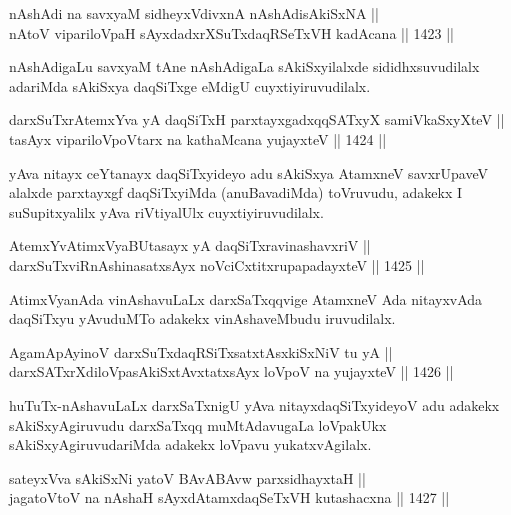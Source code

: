 \begin{shl}
nAshAdi na savxyaM sidheyxVdivxnA nAshAdisAkiSxNA || \\
nAtoV vipariloVpaH sAyxdadxrXSuTxdaqRSeTxVH kadAcana ||  1423 ||  
\end{shl}

\begin{artha}
nAshAdigaLu savxyaM tAne nAshAdigaLa sAkiSxyilalxde sididhxsuvudilalx adariMda sAkiSxya daqSiTxge eMdigU cuyxtiyiruvudilalx.
\end{artha}


\begin{shl}
darxSuTxrAtemxYva yA daqSiTxH parxtayxgadxqqSATxyX samiVkaSxyXteV ||  \\
tasAyx vipariloVpoV\s tarx na kathaMcana yujayxteV ||  1424 ||  
\end{shl}

\begin{artha}
yAva nitayx ceYtanayx daqSiTxyideyo adu sAkiSxya AtamxneV savxrUpaveV alalxde parxtayxgf daqSiTxyiMda (anuBavadiMda) toVruvudu, adakekx I suSupitxyalilx yAva riVtiyalUlx cuyxtiyiruvudilalx.
\end{artha}

\begin{shl}
AtemxYvA\s \s timxVyaBUtasayx yA daqSiTxravinashavxriV || \\
darxSuTxviRnAshinasatxsAyx noVciCxtitxrupapadayxteV ||  1425 ||  
\end{shl}

\begin{artha}
AtimxVyanAda vinAshavuLaLx darxSaTxqqvige AtamxneV Ada nitayxvAda daqSiTxyu yAvuduMTo adakekx vinAshaveMbudu iruvudilalx.
\end{artha}

\begin{shl}
AgamApAyinoV darxSuTxdaqRSiTxsatxtAsxkiSxNiV tu yA || \\
darxSATxrXdiloVpasAkiSxtAvxtatxsAyx loVpoV na yujayxteV ||  1426 ||  
\end{shl}

\begin{artha}
huTuTx-nAshavuLaLx darxSaTxnigU yAva nitayxdaqSiTxyideyoV adu adakekx sAkiSxyAgiruvudu darxSaTxqq muMtAdavugaLa loVpakUkx sAkiSxyAgiruvudariMda adakekx loVpavu yukatxvAgilalx.
\end{artha}

\begin{shl}
sateyxVva sAkiSxNi yatoV BAvABAvw parxsidhayxtaH || \\
jagatoV\s toV na nAshaH sAyxdAtamxdaqSeTxVH kutashacxna ||  1427 ||  
\end{shl}

